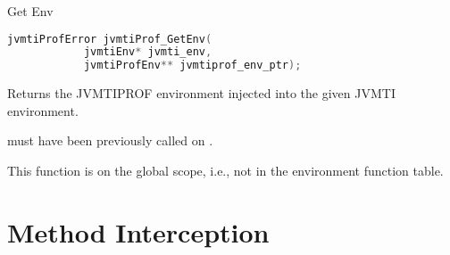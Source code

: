 \begin{apidef}{Get Env}
\begin{lstlisting}[language=C]
jvmtiProfError jvmtiProf_GetEnv(
            jvmtiEnv* jvmti_env,
            jvmtiProfEnv** jvmtiprof_env_ptr);
\end{lstlisting}

\begin{apidesc}
Returns the JVMTIPROF environment injected into the given JVMTI environment. 

\medskip
{} must have been previously called on .

\medskip
This function is on the global scope, i.e., not in the environment function table.
\end{apidesc}

\begin{apiphase}
\apiphaseany
\end{apiphase}

\begin{apicap}
\apicaprequired
\end{apicap}

\begin{apiparam}
\end{apiparam}

\begin{apierror}
\end{apierror}
\end{apidef}

\section{Method Interception}


